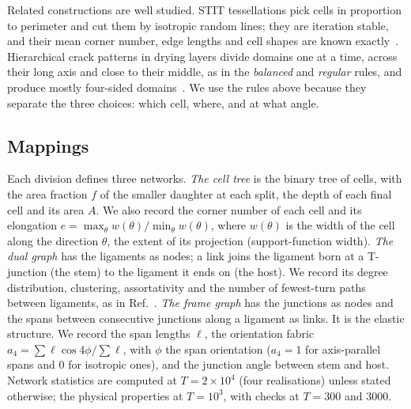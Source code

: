 \documentclass[aps,pre,twocolumn,superscriptaddress,amsmath,amssymb,floatfix]{revtex4-2}
\begin{document}
Related constructions are well studied. STIT tessellations pick cells in proportion to
perimeter and cut them by isotropic random lines; they are iteration stable, and their
mean corner number, edge lengths and cell shapes are known
exactly~\cite{nagel2005}. Hierarchical crack patterns in drying layers divide domains one
at a time, across their long axis and close to their middle, as in the \emph{balanced}
and \emph{regular} rules, and produce mostly four-sided
domains~\cite{bohn2005,bohn2005b}. We use the rules above because they separate the three
choices: which cell, where, and at what angle.

\subsection{Mappings}
Each division defines three networks.
\emph{The cell tree} is the binary tree of cells, with the area fraction $f$ of the
smaller daughter at each split, the depth of each final cell and its area $A$. We also
record the corner number of each cell and its elongation
$e=\max_\theta w(\theta)/\min_\theta w(\theta)$, where $w(\theta)$ is the width of the cell
along the direction $\theta$, the extent of its projection (support-function width).
\emph{The dual graph} has the ligaments as nodes; a link joins the ligament born at a
T-junction (the stem) to the ligament it ends on (the host). We record its degree
distribution, clustering, assortativity and the number of fewest-turn paths between
ligaments, as in Ref.~\cite{vazquez2026sr}.
\emph{The frame graph} has the junctions as nodes and the spans between consecutive
junctions along a ligament as links. It is the elastic structure. We record the span
lengths $\ell$, the orientation fabric
$a_4=\sum\ell\cos4\phi/\sum\ell$, with $\phi$ the span orientation ($a_4=1$ for
axis-parallel spans and $0$ for isotropic ones), and the junction angle between stem and
host. Network statistics are computed at $T=2\times10^4$ (four realisations) unless stated
otherwise; the physical properties at $T=10^3$, with checks at $T=300$ and $3000$.
\end{document}
